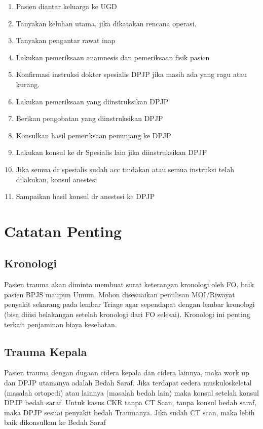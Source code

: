 \documentclass[
]{book}
\providecommand{\tightlist}{%
  \setlength{\itemsep}{0pt}\setlength{\parskip}{0pt}}
\begin{document}
\begin{enumerate}
\def\labelenumi{\arabic{enumi}.}
\tightlist
\item
  Pasien diantar keluarga ke UGD
\item
  Tanyakan keluhan utama, jika dikatakan rencana operasi.
\item
  Tanyakan pengantar rawat inap
\item
  Lakukan pemeriksaan anamnesis dan pemeriksaan fisik pasien
\item
  Konfirmasi instruksi dokter spesialis DPJP jika masih ada yang ragu atau kurang.
\item
  Lakukan pemeriksaan yang diinstruksikan DPJP
\item
  Berikan pengobatan yang diinstruksikan DPJP
\item
  Konsulkan hasil pemeriksaan penunjang ke DPJP
\item
  Lakukan konsul ke dr Spesialis lain jika diinstruksikan DPJP
\item
  Jika semua dr spesialis sudah acc tindakan atau semua instruksi telah dilakukan, konsul anestesi
\item
  Sampaikan hasil konsul dr anestesi ke DPJP
\end{enumerate}

\hypertarget{catatan-penting}{%
\chapter{Catatan Penting}\label{catatan-penting}}

\hypertarget{kronologi}{%
\section{Kronologi}\label{kronologi}}

Pasien trauma akan diminta membuat surat keterangan kronologi oleh FO, baik pasien BPJS maupun Umum.
Mohon disesuaikan penulisan MOI/Riwayat penyakit sekarang pada lembar Triage agar sependapat dengan lembar kronologi (bisa diiisi belakangan setelah kronologi dari FO selesai).
Kronologi ini penting terkait penjaminan biaya kesehatan.

\hypertarget{trauma-kepala}{%
\section{Trauma Kepala}\label{trauma-kepala}}

Pasien trauma dengan dugaan cidera kepala dan cidera lainnya, maka work up dan DPJP utamanya adalah Bedah Saraf. Jika terdapat cedera muskuloskeletal (masalah ortopedi) atau lainnya (masalah bedah lain) maka konsul setelah konsul DPJP bedah saraf. Untuk kasus CKR tanpa CT Scan, tanpa konsul bedah saraf, maka DPJP sesuai penyakit bedah Traumanya. Jika sudah CT scan, maka lebih baik dikonsulkan ke Bedah Saraf
\end{document}

